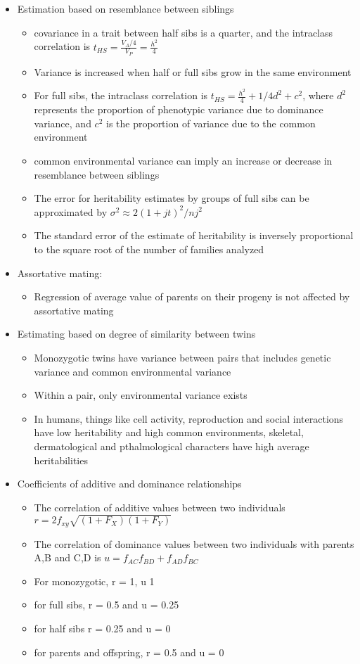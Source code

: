 \documentclass[12pt]{amsart}
\begin{document}
\begin{itemize}
\begin{itemize}
\end{itemize}
\item Estimation based on resemblance between siblings 
\begin{itemize}
\item covariance in a trait between half sibs is a quarter, and the intraclass correlation is $t_{HS} = \frac{V_A/4}{V_P} = \frac{h^2}{4}$
\item Variance is increased when half or full sibs grow in the same environment 
\item For full sibs, the intraclass correlation is $t_{HS} = \frac{h^2}{4} + 1/4d^2 + c^2$, where $d^2$ represents the proportion of phenotypic variance due to dominance variance, and $c^2$ is the proportion of variance due to the common environment 
\item common environmental variance can imply an increase or decrease in resemblance between siblings 
\item The error for heritability estimates by groups of full sibs can be approximated by $\sigma^2 \approx 2(1 + jt)^2 / nj^2$
\item The standard error of the estimate of heritability is inversely proportional to the square root of the number of families analyzed 
\end{itemize}
\item Assortative mating: 
\begin{itemize}
\item Regression of average value of parents on their progeny is not affected by assortative mating 
\end{itemize}
\item Estimating based on degree of similarity between twins
\begin{itemize}
\item Monozygotic twins have variance between pairs that includes genetic variance and common environmental variance
\item Within a pair, only environmental variance exists
\item In humans, things like cell activity, reproduction and social interactions have low heritability and high common environments, skeletal, dermatological and pthalmological characters have high average heritabilities 
\end{itemize}
\item Coefficients of additive and dominance relationships
\begin{itemize}
\item The correlation of additive values between two individuals $r = 2f_{xy}\sqrt{(1+F_X)(1+F_Y)}$
\item The correlation of dominance values between two individuals with parents A,B and C,D is $u = f_{AC}f_{BD} + f_{AD}f_{BC}$
\item For monozygotic, r = 1, u 1
\item for full sibs, r = 0.5 and u = 0.25
\item for half sibs r = 0.25 and u = 0
\item for parents and offspring, r = 0.5 and u = 0
\end{itemize}
\end{itemize}
\end{document}
